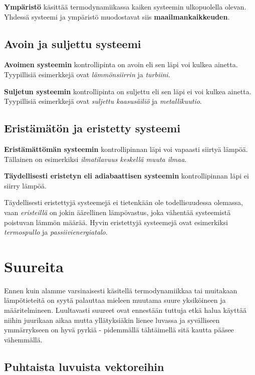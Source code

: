 \documentclass[12pt,a4paper,finnish]{book}
\begin{document}
\textbf{Ympäristö} käsittää termodynamiikassa kaiken systeemin ulkopuolella olevan. Yhdessä systeemi ja ympäristö 
muodostavat siis \textbf{maailmankaikkeuden}.

\section{Avoin ja suljettu systeemi}

\textbf{Avoimen systeemin} kontrollipinta on avoin eli sen läpi voi kulkea ainetta. Tyypillisiä esimerkkejä 
ovat \textit{lämmönsiirrin} ja \textit{turbiini}.

\textbf{Suljetun systeemin} kontrollipinta on suljettu eli sen läpi ei voi kulkea ainetta. Tyypillisiä 
esimerkkejä ovat \textit{suljettu kaasusäiliö} ja \textit{metallikuutio}.

\section{Eristämätön ja eristetty systeemi}

\textbf{Eristämättömän systeemin} kontrollipinnan läpi voi vapaasti siirtyä lämpöä. 
Tällainen on esimerkiksi \textit{ilmatilavuus keskellä muuta ilmaa}.

\textbf{Täydellisesti eristetyn eli adiabaattisen systeemin} kontrollipinnan läpi ei siirry lämpöä.

Täydellisesti eristettyjä systeemejä ei tietenkään ole todellisuudessa olemassa, vaan \textit{eristeillä} 
on jokin äärellinen lämpövastus, joka vähentää systeemistä poistuvan lämmön määrää. Hyvin eristettyjä 
systeemejä ovat esimerkiksi \textit{termospullo} ja \textit{passiivienergiatalo}.

\chapter{Suureita} %

Ennen kuin alamme varsinaisesti käsitellä termodynamiikkaa tai muitakaan lämpötieteitä on syytä palauttaa mieleen 
muutama suure yksiköineen ja määritelmineen. Luultavasti suureet ovat ennestään tuttuja etkä halua käyttää 
niihin juurikaan aikaa mutta yllätyksiäkin lienee luvassa ja syvälliseen ymmärrykseen on hyvä pyrkiä - pidemmällä 
tähtäimellä sitä kautta pääsee vähemmällä.

\section{Puhtaista luvuista vektoreihin}
\end{document}
